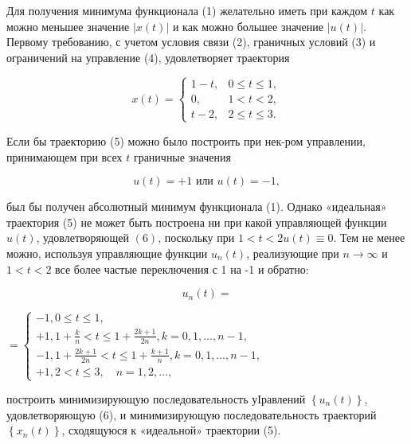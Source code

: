 \documentclass[10pt]{article}
\begin{document}
Для получения минимума функционала (1) желательно иметь при каждом $t$ как можно меньшее значение $|x(t)|$ и как можно большее значение $|u(t)|$. Первому требованию, с учетом условия связи (2), граничных условий (3) и ограничений на управление (4), удовлетворяет траектория



\[

x(t)=\left\{\begin{array}{cl}

1-t, & 0 \leqslant t \leqslant 1, \\

0, & 1<t<2, \\

t-2, & 2 \leqslant t \leqslant 3 .

\end{array}\right.

\]



Если бы траекторию (5) можно было построить при нек-ром управлении, принимающем при всех $t$ граничные значения



\[

u(t)=+1 \text { или } u(t)=-1,

\]



был бы получен абсолютный минимум функционала (1). Однако «идеальная» траектория (5) не может быть построена ни при какой управляющей функции $u(t)$, удовлетворяющей $(6)$, поскольку при $1<t<2 u(t) \equiv 0$. Тем не менее можно, используя управляющие функции $u_{n}(t)$, реализующие при $n \rightarrow \infty$ и $1<t<2$ все более частые переключения с 1 на -1 и обратно:



\[

u_{n}(t)=

\]



$=\left\{\begin{array}{l}-1,0 \leqslant t \leqslant 1, \\ +1,1+\frac{k}{n}<t \leqslant 1+\frac{2 k+1}{2 n}, k=0,1, \ldots, n-1, \\ -1,1+\frac{2 k+1}{2 n}<t \leqslant 1+\frac{k+1}{n}, k=0,1, \ldots, n-1, \\ +1,2<t \leqslant 3, \quad n=1,2, \ldots,\end{array}\right.$



построить минимизирующую последовательность уІравлений $\left\{u_{n}(t)\right\}$, удовлетворяющую (6), и минимизирующую последовательность траекторий $\left\{x_{n}(t)\right\}$, сходящуюся к «идеальной» траектории (5).
\end{document}
